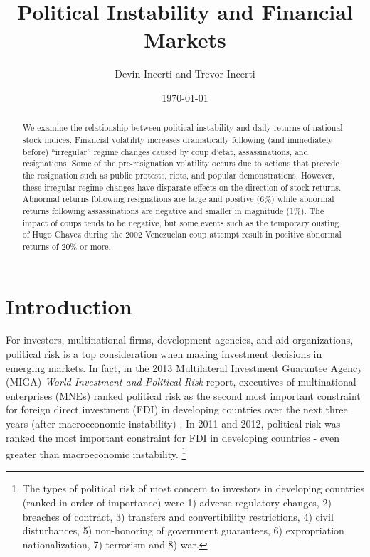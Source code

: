 \documentclass[12pt,final,fleqn]{article}
\theoremstyle{plain}
\begin{document}
\author{Devin Incerti and Trevor Incerti}
\title{\textbf{Political Instability and Financial Markets}}
\date{\today}
\maketitle

\singlespacing
\begin{abstract}
We examine the relationship between political instability and daily returns of national stock indices. Financial volatility increases dramatically following (and immediately before) ``irregular'' regime changes caused by coup d'etat, assassinations, and resignations. Some of the pre-resignation volatility occurs due to actions that precede the resignation such as public protests, riots, and popular demonstrations. However, these irregular regime changes have disparate effects on the direction of stock returns. Abnormal returns following resignations are large and positive (6\%) while abnormal returns following assassinations are negative and smaller in magnitude (1\%). The impact of coups tends to be negative, but some events such as the temporary ousting of Hugo Chavez during the 2002 Venezuelan coup attempt result in positive abnormal returns of 20\% or more.
\end{abstract}
\doublespacing

\section{Introduction} \label{sec:Introduction}
For investors, multinational firms, development agencies, and aid organizations, political risk is a top consideration when making investment decisions in emerging markets. In fact, in the 2013 Multilateral Investment Guarantee Agency (MIGA) \textit{World Investment and Political Risk} report, executives of multinational enterprises (MNEs) ranked political risk as the second most important constraint for foreign direct investment (FDI) in developing countries over the next three years (after macroeconomic instability) \citep{wipr2013}. In 2011 and 2012, political risk was ranked the most important constraint for FDI in developing countries - even greater than macroeconomic instability. \footnote{The types of political risk of most concern to investors in developing countries (ranked in order of importance) were 1) adverse regulatory changes, 2) breaches of contract, 3) transfers and convertibility restrictions, 4) civil disturbances, 5) non-honoring of government guarantees, 6) expropriation nationalization, 7) terrorism and 8) war.}
\end{document}

